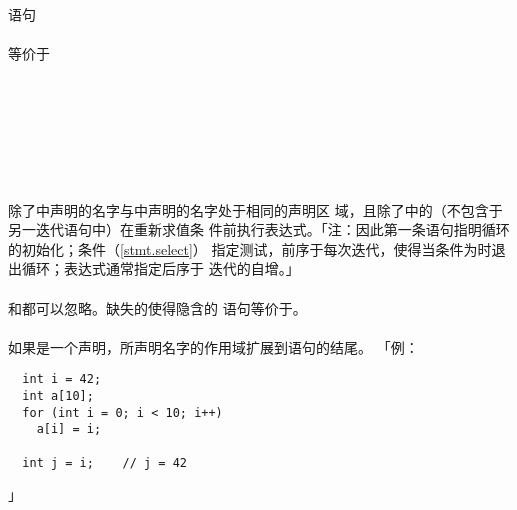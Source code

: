 \paragraph{}
语句                                                                  \\
\mbox{\qquad {}  \tm{;}
   \tm{)} }                            \\
等价于                                                                        \\
\mbox{\qquad \tm{\{}}                                                         \\
\mbox{\qquad\qquad {}}                                       \\
\mbox{\qquad\qquad {}  \tm{) \{}}                     \\
\mbox{\qquad\qquad\qquad {}}                                      \\
\mbox{\qquad\qquad\qquad {} \tm{;}}                              \\
\mbox{\qquad\qquad \tm{\}}}                                                   \\
\mbox{\qquad \tm{\}}}                                                         \\
除了中声明的名字与中声明的名字处于相同的声明区
域，且除了中的（不包含于另一迭代语句中）在重新求值条
件前执行表达式。「注：因此第一条语句指明循环的初始化；条件（\ref{stmt.select}）
指定测试，前序于每次迭代，使得当条件为时退出循环；表达式通常指定后序于
迭代的自增。」

\paragraph{}
和都可以忽略。缺失的使得隐含的
语句等价于。

\paragraph{}
如果是一个声明，所声明名字的作用域扩展到语句的结尾。
「例：
\begin{lstlisting}
  int i = 42;
  int a[10];
  for (int i = 0; i < 10; i++)
    a[i] = i;

  int j = i;    // j = 42
\end{lstlisting}」

